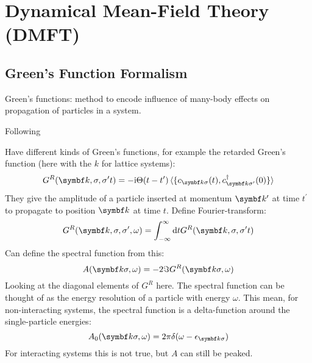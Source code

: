 \documentclass[../notes.tex]{subfiles}
\begin{document}

\section{Dynamical Mean-Field Theory (DMFT)}\label{sec:Dynamical Mean-Field Theory}


\subsection*{Green's Function Formalism}


Green's functions: method to encode influence of many-body effects on propagation of particles in a system.

Following~\cite{bruusManyBodyQuantumTheory2004}



Have different kinds of Green's functions, for example the retarded Green's function (here with the \(k\) for lattice systems):
\begin{equation}
	G^R (\vb{k}, \sigma, \sigma^{\prime} t) = -\iu \Theta(t- t^{\prime}) \braket{ \{c_{\vb{k} \sigma} (t), c_{\vb{k} \sigma^{\prime}}^{\dagger} (0)\}}
\end{equation}
They give the amplitude of a particle inserted at momentum \(\vb{k}^{\prime}\) at time \(t^{\prime}\) to propagate to position \(\vb{k}\) at time \(t\).
Define Fourier-transform:
\begin{equation}
	G^R (\vb{k}, \sigma, \sigma^{\prime}, \omega) = \int_{-\infty}^{\infty} \odif{t} G^R (\vb{k}, \sigma, \sigma^{\prime} t)
\end{equation}
Can define the spectral function from this:
\begin{equation}
	A(\vb{k} \sigma, \omega) = -2 \Im G^R (\vb{k} \sigma, \omega)
\end{equation}
Looking at the diagonal elements of \(G^R\) here.
The spectral function can be thought of as the energy resolution of a particle with energy \(\omega\).
This mean, for non-interacting systems, the spectral function is a delta-function around the single-particle energies:
\begin{equation}
	A_0 (\vb{k} \sigma, \omega) = 2\pi \delta (\omega - \epsilon_{\vb{k} \sigma})
\end{equation}
For interacting systems this is not true, but \(A\) can still be peaked.
\end{document}

